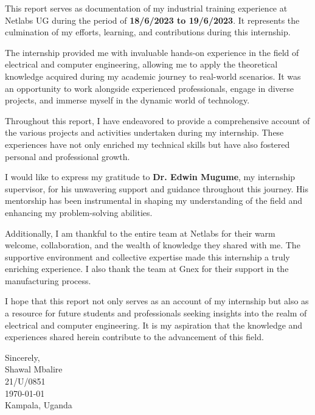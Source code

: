
This report serves as documentation of my industrial training experience at Netlabs UG during the period of \textbf{18/6/2023 to 19/6/2023}. It represents the culmination of my efforts, learning, and contributions during this internship.

The internship provided me with invaluable hands-on experience in the field of electrical and computer engineering, allowing me to apply the theoretical knowledge acquired during my academic journey to real-world scenarios. It was an opportunity to work alongside experienced professionals, engage in diverse projects, and immerse myself in the dynamic world of technology.

Throughout this report, I have endeavored to provide a comprehensive account of the various projects and activities undertaken during my internship. These experiences have not only enriched my technical skills but have also fostered personal and professional growth.

I would like to express my gratitude to \textbf{Dr. Edwin Mugume}, my internship supervisor, for his unwavering support and guidance throughout this journey. His mentorship has been instrumental in shaping my understanding of the field and enhancing my problem-solving abilities.

Additionally, I am thankful to the entire team at Netlabs for their warm welcome, collaboration, and the wealth of knowledge they shared with me. The supportive environment and collective expertise made this internship a truly enriching experience. I also thank the team at Gnex for their support in the manufacturing process.

I hope that this report not only serves as an account of my internship but also as a resource for future students and professionals seeking insights into the realm of electrical and computer engineering. It is my aspiration that the knowledge and experiences shared herein contribute to the advancement of this field.

\begin{flushright}
    Sincerely, \\
    Shawal Mbalire \\
    21/U/0851 \\
    \today \\
    Kampala, Uganda
\end{flushright}
